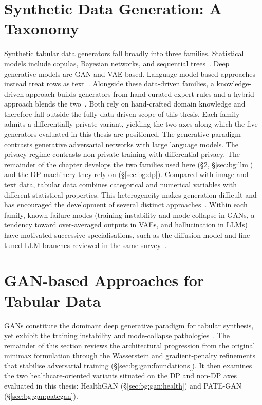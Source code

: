 \section{Synthetic Data Generation: A Taxonomy}
\label{sec:bg:taxonomy}

Synthetic tabular data generators fall broadly into three families. Statistical
models include copulas, Bayesian networks, and sequential
trees~\cite{shi2025comprehensive, emam2021optimizing}. 
Deep generative models are GAN and VAE-based.
Language-model-based approaches instead treat rows as
text~\cite{shi2025comprehensive,Borisov2023GReaT}.
Alongside these data-driven families, a knowledge-driven approach builds
generators from hand-curated expert rules and a hybrid approach blends the
two~\cite{Murtaza2023}. Both rely on hand-crafted domain knowledge and therefore fall
outside the fully data-driven scope of this thesis. Each
family admits a differentially private variant, yielding the two axes along which
the five generators evaluated in this thesis are positioned. The generative
paradigm contrasts generative adversarial networks with large language
models. The privacy regime contrasts non-private training with
differential privacy. The
remainder of the chapter develops the two families used here
(§\ref{sec:bg:gan}, §\ref{sec:bg:llm}) and the DP machinery they rely on
(§\ref{sec:bg:dp}). Compared with image and text data, tabular data combines categorical and
numerical variables with different statistical properties. This
heterogeneity makes generation difficult and has encouraged the
development of several distinct approaches~\cite{shi2025comprehensive}.
Within each family, known failure modes (training instability and mode collapse in GANs,
a tendency toward over-averaged outputs in VAEs, and hallucination in LLMs) have
motivated successive specialisations, such as the diffusion-model and
fine-tuned-LLM branches reviewed in the same survey~\cite{shi2025comprehensive}.


\section{GAN-based Approaches for Tabular Data}
\label{sec:bg:gan}

GANs constitute the dominant deep generative
paradigm for tabular synthesis, yet exhibit the training instability and
mode-collapse pathologies~\cite{shi2025comprehensive}. The remainder of this section reviews
the architectural progression from the original minimax formulation through
the Wasserstein and gradient-penalty refinements that stabilise adversarial
training (§\ref{sec:bg:gan:foundations}). It then examines the two
healthcare-oriented variants situated on the DP and non-DP axes evaluated
in this thesis: HealthGAN (§\ref{sec:bg:gan:health}) and
PATE-GAN (§\ref{sec:bg:gan:pategan}).


